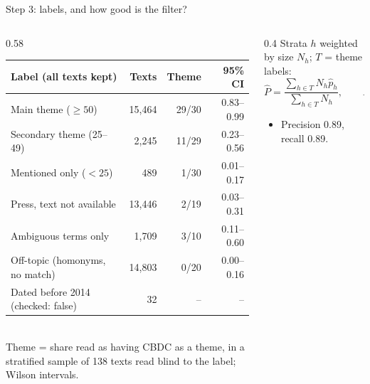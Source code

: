 \documentclass[aspectratio=169,10pt]{beamer}
\begin{document}
\begin{frame}{Step 3: labels, and how good is the filter?}
\begin{columns}[T]
\begin{column}{0.58\textwidth}\scriptsize
\setlength{\tabcolsep}{3pt}
\begin{tabular}{@{}lrrr@{}}\toprule
\textbf{Label (all texts kept)} & \textbf{Texts} & \textbf{Theme} & \textbf{95\% CI}\\\midrule
Main theme ($\geq 50$) & 15,464 & 29/30 & 0.83--0.99 \\
Secondary theme (25--49) & 2,245 & 11/29 & 0.23--0.56 \\
Mentioned only ($<25$) & 489 & 1/30 & 0.01--0.17 \\
Press, text not available & 13,446 & 2/19 & 0.03--0.31 \\
Ambiguous terms only & 1,709 & 3/10 & 0.11--0.60 \\
Off-topic (homonyms, no match) & 14,803 & 0/20 & 0.00--0.16 \\
Dated before 2014 (checked: false) & 32 & -- & -- \\
\bottomrule\end{tabular}\\[3pt]
Theme = share read as having CBDC as a theme, in a stratified sample of 138 texts read blind to the label; Wilson intervals.
\end{column}
\begin{column}{0.4\textwidth}\small
Strata $h$ weighted by size $N_h$; $T$ = theme labels:
\[ \widehat{P} = \frac{\sum_{h\in T} N_h \hat p_h}{\sum_{h\in T} N_h}, \qquad \widehat{R} = \frac{\sum_{h\in T} N_h \hat p_h}{\sum_{h} N_h \hat p_h} \]
\begin{itemize}\setlength\itemsep{1pt}
\item Precision \alert{0.89}, recall \alert{0.89}.

\end{itemize}
\end{column}
\end{columns}
\end{frame}
\end{document}
